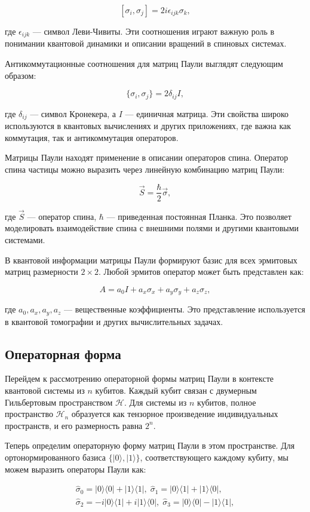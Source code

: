 \documentclass[a4paper]{report}
\begin{document}
$$
[\sigma_i, \sigma_j] = 2i\epsilon_{ijk}\sigma_k,
$$

где $\epsilon_{ijk}$ — символ Леви-Чивиты. Эти соотношения играют важную роль в понимании квантовой динамики и описании вращений в спиновых системах.

Антикоммутационные соотношения для матриц Паули выглядят следующим образом:

$$
\{\sigma_i, \sigma_j\} = 2\delta_{ij}I,
$$

где $\delta_{ij}$ — символ Кронекера, а $I$ — единичная матрица. Эти свойства широко используются в квантовых вычислениях и других приложениях, где важна как коммутация, так и антикоммутация операторов.

Матрицы Паули находят применение в описании операторов спина. Оператор спина частицы можно выразить через линейную комбинацию матриц Паули:

$$
\vec{S} = \frac{\hbar}{2} \vec{\sigma},
$$

где $\vec{S}$ — оператор спина, $\hbar$ — приведенная постоянная Планка. Это позволяет моделировать взаимодействие спина с внешними полями и другими квантовыми системами.

В квантовой информации матрицы Паули формируют базис для всех эрмитовых матриц размерности $2 \times 2$. Любой эрмитов оператор может быть представлен как:

$$
A = a_0 I + a_x \sigma_x + a_y \sigma_y + a_z \sigma_z,
$$

где $a_0, a_x, a_y, a_z$ — вещественные коэффициенты. Это представление используется в квантовой томографии и других вычислительных задачах.

\subsection{Операторная форма}

Перейдем к рассмотрению операторной формы матриц Паули в контексте квантовой системы из $n$ кубитов. Каждый кубит связан с двумерным Гильбертовым пространством $\mathcal{H}$. Для системы из $n$ кубитов, полное пространство $\mathcal{H}_n$ образуется как тензорное произведение индивидуальных пространств, и его размерность равна $2^n$.

Теперь определим операторную форму матриц Паули в этом пространстве. Для ортонормированного базиса $\{|0\rangle, |1\rangle\}$, соответствующего каждому кубиту, мы можем выразить операторы Паули как:

\begin{align*}
    \hat{\sigma}_0 = |0\rangle\langle0| + |1\rangle\langle1|,\; \hat{\sigma}_1 = |0\rangle\langle1| + |1\rangle\langle0|,     \\
    \hat{\sigma}_2 = -i|0\rangle\langle1| + i|1\rangle\langle0|,\;  \hat{\sigma}_3 = |0\rangle\langle0| - |1\rangle\langle1|,
\end{align*}
\end{document}
